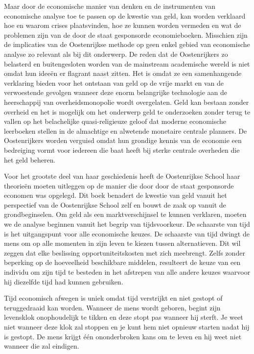 \documentclass[
  a5paper,
  smalldemyvopaper,11pt,twoside,onecolumn,openright,extrafontsizes,
hidelinks]{memoir}
\begin{document}
Maar door de economische manier van denken en de instrumenten van
economische analyse toe te passen op de kwestie van geld, kan worden
verklaard hoe en waarom crises plaatsvinden, hoe ze kunnen worden
vermeden en wat de problemen zijn van de door de staat gesponsorde
economieboeken. Misschien zijn de implicaties van de Oostenrijkse
methode op geen enkel gebied van economische analyse zo relevant als bij
dit onderwerp. De reden dat de Oostenrijkers zo belasterd en
buitengesloten worden van de mainstream academische wereld is niet omdat
hun ideeën er flagrant naast zitten. Het is omdat ze een samenhangende
verklaring bieden voor het ontstaan van geld op de vrije markt en van de
verwoestende gevolgen wanneer deze enorm belangrijke technologie aan de
heerschappij van overheidsmonopolie wordt overgelaten. Geld kan bestaan
zonder overheid en het is mogelijk om het onderwerp geld te onderzoeken
zonder terug te vallen op het belachelijke quasi-religieuze geloof dat
moderne economische leerboeken stellen in de almachtige en alwetende
monetaire centrale planners. De Oostenrijkers worden verguisd omdat hun
grondige kennis van de economie een bedreiging vormt voor iedereen die
baat heeft bij sterke centrale overheden die het geld beheren.

Voor het grootste deel van haar geschiedenis heeft de Oostenrijkse
School haar theorieën moeten uitleggen op de manier die door door de
staat gesponsorde economen was opgelegd. Dit boek benadert de kwestie
van geld vanuit het perspectief van de Oostenrijkse School zelf en bouwt
de zaak op vanuit de grondbeginselen. Om geld als een marktverschijnsel
te kunnen verklaren, moeten we de analyse beginnen vanuit het begrip van
tijdsvoorkeur. De schaarste van tijd is het uitgangspunt voor alle
economische keuzes. De schaarste van tijd dwingt de mens om op alle
momenten in zijn leven te kiezen tussen alternatieven. Dit wil zeggen
dat elke beslissing opportuniteitskosten met zich meebrengt. Zelfs
zonder beperking op de hoeveelheid beschikbare middelen, resulteert de
keuze van een individu om zijn tijd te besteden in het afstrepen van
alle andere keuzes waarvoor hij diezelfde tijd had kunnen gebruiken.

Tijd economisch afwegen is uniek omdat tijd verstrijkt en niet gestopt
of teruggedraaid kan worden. Wanneer de mens wordt geboren, begint zijn
levensklok onophoudelijk te tikken en deze stopt pas wanneer hij sterft.
Je weet niet wanneer deze klok zal stoppen en je kunt hem niet opnieuw
starten nadat hij is gestopt. De mens krijgt één ononderbroken kans om
te leven en hij weet niet wanneer die zal eindigen.
\end{document}
